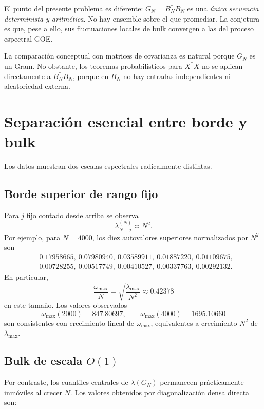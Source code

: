 \documentclass[11pt,a4paper]{article}
\begin{document}
El punto del presente problema es diferente: $G_N=B_N^*B_N$ es una \emph{única secuencia determinista y aritmética}. No hay ensemble sobre el que promediar. La conjetura es que, pese a ello, sus fluctuaciones locales de bulk convergen a las del proceso espectral GOE.

La comparación conceptual con matrices de covarianza es natural porque $G_N$ es un Gram. No obstante, los teoremas probabilísticos para $X^*X$ no se aplican directamente a $B_N^*B_N$, porque en $B_N$ no hay entradas independientes ni aleatoriedad externa.

\section{Separación esencial entre borde y bulk}

Los datos muestran dos escalas espectrales radicalmente distintas.

\subsection{Borde superior de rango fijo}

Para $j$ fijo contado desde arriba se observa
\begin{equation}
\lambda_{N-j}^{(N)}\asymp N^2.
\end{equation}
Por ejemplo, para $N=4000$, los diez autovalores superiores normalizados por $N^2$ son
\begin{equation}
\begin{split}
&0.17958665,\ 0.07980940,\ 0.03589911,\ 0.01887220,\ 0.01109675,\\
&0.00728255,\ 0.00517749,\ 0.00410527,\ 0.00337763,\ 0.00292132.
\end{split}
\label{eq:edge4000}
\end{equation}
En particular,
\begin{equation}
\frac{\omega_{\max}}{N}
=\sqrt{\frac{\lambda_{\max}}{N^2}}
\approx0.42378
\end{equation}
en este tamaño. Los valores observados
\[
\omega_{\max}(2000)=847.80697,\qquad
\omega_{\max}(4000)=1695.10660
\]
son consistentes con crecimiento lineal de $\omega_{\max}$, equivalentes a crecimiento $N^2$ de $\lambda_{\max}$.

\subsection{Bulk de escala $O(1)$}

Por contraste, los cuantiles centrales de $\lambda(G_N)$ permanecen prácticamente inmóviles al crecer $N$. Los valores obtenidos por diagonalización densa directa son:
\end{document}
